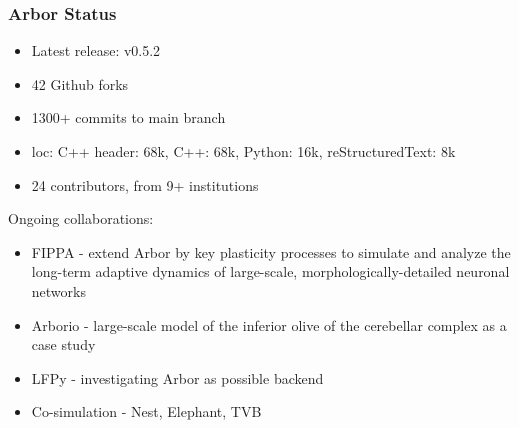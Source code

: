 \documentclass[t]{beamer}
\begin{document}
{

}

\begin{frame}
    \frametitle{Arbor Status}

    \begin{itemize}
        \item Latest release: v0.5.2
        \item 42 Github forks
        \item 1300+ commits to main branch
        \item loc: C++ header: 68k, C++: 68k, Python: 16k, reStructuredText: 8k
        \item 24 contributors, from 9+ institutions
    \end{itemize}

    Ongoing collaborations:
    \begin{itemize}
    \item FIPPA - extend Arbor by key plasticity processes to simulate and analyze the long-term adaptive dynamics of large-scale, morphologically-detailed neuronal networks
    \item Arborio - large-scale model of the inferior olive of the cerebellar complex as a case study
    \item LFPy - investigating Arbor as possible backend
    \item Co-simulation - Nest, Elephant, TVB
    \end{itemize}

\end{frame}
\end{document}
